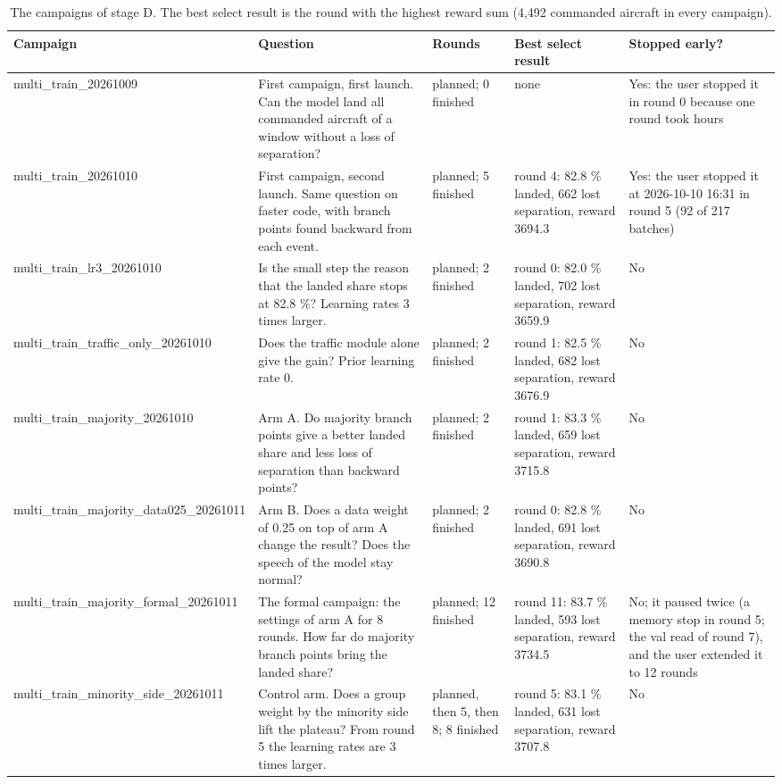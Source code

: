 \documentclass[10pt]{article}
\begin{document}
\begin{table}[htbp]
\centering
\footnotesize
\caption{The campaigns of stage D. The best select result is the round with the highest reward sum (4,492 commanded aircraft in every campaign).}
\label{tab:6}
\begin{tabular}{>{\raggedright\arraybackslash}p{3.2cm}>{\raggedright\arraybackslash}p{4.4cm}>{\raggedright\arraybackslash}p{1.5cm}>{\raggedright\arraybackslash}p{3.3cm}>{\raggedright\arraybackslash}p{2.3cm}}
\toprule
Campaign & Question & Rounds & Best select result & Stopped early? \\
\midrule
multi\_train\_20261009 & First campaign, first launch. Can the model land all commanded aircraft of a window without a loss of separation? & 8 planned; 0 finished & none & Yes: the user stopped it in round 0 because one round took hours \\
multi\_train\_20261010 & First campaign, second launch. Same question on faster code, with branch points found backward from each event. & 8 planned; 5 finished & round 4: 82.8 \% landed, 662 lost separation, reward 3694.3 & Yes: the user stopped it at 2026-10-10 16:31 in round 5 (92 of 217 batches) \\
multi\_train\_lr3\_20261010 & Is the small step the reason that the landed share stops at 82.8 \%? Learning rates 3 times larger. & 2 planned; 2 finished & round 0: 82.0 \% landed, 702 lost separation, reward 3659.9 & No \\
multi\_train\_traffic\_only\_20261010 & Does the traffic module alone give the gain? Prior learning rate 0. & 2 planned; 2 finished & round 1: 82.5 \% landed, 682 lost separation, reward 3676.9 & No \\
multi\_train\_majority\_20261010 & Arm A. Do majority branch points give a better landed share and less loss of separation than backward points? & 2 planned; 2 finished & round 1: 83.3 \% landed, 659 lost separation, reward 3715.8 & No \\
multi\_train\_majority\_data025\_20261011 & Arm B. Does a data weight of 0.25 on top of arm A change the result? Does the speech of the model stay normal? & 2 planned; 2 finished & round 0: 82.8 \% landed, 691 lost separation, reward 3690.8 & No \\
multi\_train\_majority\_formal\_20261011 & The formal campaign: the settings of arm A for 8 rounds. How far do majority branch points bring the landed share? & 8 planned; 12 finished & round 11: 83.7 \% landed, 593 lost separation, reward 3734.5 & No; it paused twice (a memory stop in round 5; the val read of round 7), and the user extended it to 12 rounds \\
multi\_train\_minority\_side\_20261011 & Control arm. Does a group weight by the minority side lift the plateau? From round 5 the learning rates are 3 times larger. & 3 planned, then 5, then 8; 8 finished & round 5: 83.1 \% landed, 631 lost separation, reward 3707.8 & No \\
\bottomrule
\end{tabular}


\end{table}
\end{document}
